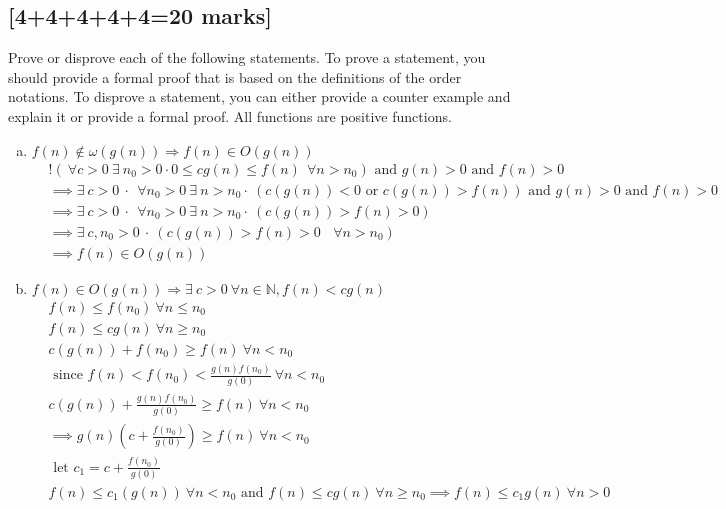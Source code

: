 \documentclass[12pt]{article}
\begin{document}
\subsection{[4+4+4+4+4=20 marks]}
Prove or disprove each of the following statements.  To prove a
statement, you should provide a formal proof that is based on the
definitions of the order notations.  To disprove a statement, you can
either provide a counter example and explain it or provide a formal proof.
All functions are positive functions.
\begin{enumerate}[(a)]
\item $f(n) \not \in \omega(g(n)) \Rightarrow f(n) \in O(g(n))$\\
\begin{align*}
  &!(\ \forall c > 0 \  \exists \  n_0 > 0 \cdot 0 \leq cg(n) \leq f(n) \  \ \forall n > n_0) \text{ and } g(n) > 0 \text{ and } f(n) > 0\\
  &\implies \exists \  c > 0 \  \cdot \  \ \forall n_0 > 0 \  \exists \  n > n_0 \cdot \  (c(g(n)) < 0 \text{ or } c(g(n)) > f(n)) \text{ and } g(n) > 0 \text{ and } f(n) > 0\\
  &\implies \exists \  c > 0 \  \cdot \  \ \forall n_0 > 0 \  \exists \  n > n_0 \cdot \  (c(g(n)) > f(n) > 0)\\
  &\implies \exists \  c, n_0 > 0 \  \cdot \  (c(g(n)) > f(n) > 0 \text{  }\ \forall n > n_0)\\
  &\implies f(n) \in O{(g(n))}
\end{align*}
\item $f(n) \in O(g(n)) \Rightarrow \exists \  c>0 \ \forall n\in \mathbb{N}, f(n) < c g(n)$\\
\begin{align*}
  &f(n) \leq f(n_0) \ \forall n \leq n_0\\
  &f(n) \leq cg(n) \ \forall n \geq n_0\\
  &c(g(n)) + f(n_0) \geq f(n) \ \forall n < n_0\\
  &\text{ since } f(n) < f(n_0) < \frac{g(n)f(n_0)}{g(0)} \ \forall n < n_0\\
  &c(g(n)) + \frac{g(n)f(n_0)}{g(0)} \geq f(n) \ \forall n < n_0\\
  &\implies g(n)(c + \frac{f(n_0)}{g(0)}) \geq f(n) \ \forall n < n_0\\
  &\text{ let } c_1 = c + \frac{f(n_0)}{g(0)}\\
  &f(n) \leq c_1(g(n)) \ \forall n <   n_0 \text{ and } f(n) \leq cg(n) \ \forall n \geq n_0 \implies f(n) \leq c_1g(n) \ \forall n > 0\\

\end{align*}
\end{enumerate}
\end{document}
